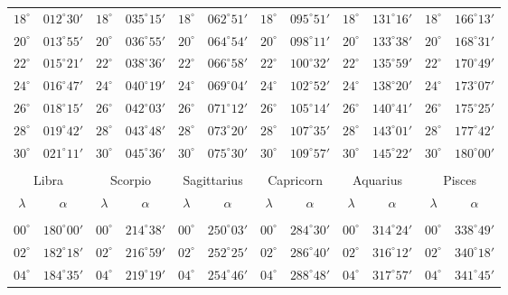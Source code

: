 \begin{table}[!h]
{\begin{tabular}{cc|cc|cc|cc|cc|cc}
$18^\circ$ & $012^\circ30'$ & $18^\circ$ & $035^\circ15'$ & $18^\circ$ & $062^\circ51'$ & $18^\circ$ & $095^\circ51'$ & $18^\circ$ & $131^\circ16'$ & $18^\circ$ & $166^\circ13'$\\
$20^\circ$ & $013^\circ55'$ & $20^\circ$ & $036^\circ55'$ & $20^\circ$ & $064^\circ54'$ & $20^\circ$ & $098^\circ11'$ & $20^\circ$ & $133^\circ38'$ & $20^\circ$ & $168^\circ31'$\\
$22^\circ$ & $015^\circ21'$ & $22^\circ$ & $038^\circ36'$ & $22^\circ$ & $066^\circ58'$ & $22^\circ$ & $100^\circ32'$ & $22^\circ$ & $135^\circ59'$ & $22^\circ$ & $170^\circ49'$\\
$24^\circ$ & $016^\circ47'$ & $24^\circ$ & $040^\circ19'$ & $24^\circ$ & $069^\circ04'$ & $24^\circ$ & $102^\circ52'$ & $24^\circ$ & $138^\circ20'$ & $24^\circ$ & $173^\circ07'$\\
$26^\circ$ & $018^\circ15'$ & $26^\circ$ & $042^\circ03'$ & $26^\circ$ & $071^\circ12'$ & $26^\circ$ & $105^\circ14'$ & $26^\circ$ & $140^\circ41'$ & $26^\circ$ & $175^\circ25'$\\
$28^\circ$ & $019^\circ42'$ & $28^\circ$ & $043^\circ48'$ & $28^\circ$ & $073^\circ20'$ & $28^\circ$ & $107^\circ35'$ & $28^\circ$ & $143^\circ01'$ & $28^\circ$ & $177^\circ42'$\\
$30^\circ$ & $021^\circ11'$ & $30^\circ$ & $045^\circ36'$ & $30^\circ$ & $075^\circ30'$ & $30^\circ$ & $109^\circ57'$ & $30^\circ$ & $145^\circ22'$ & $30^\circ$ & $180^\circ00'$\\
\multicolumn{12}{c}{}\\
\multicolumn{2}{c}{Libra}\vline & \multicolumn{2}{c}{Scorpio} \vline& \multicolumn{2}{c}{Sagittarius} \vline& \multicolumn{2}{c}{Capricorn}\vline &
\multicolumn{2}{c}{Aquarius}\vline & \multicolumn{2}{c}{Pisces}\\\hline
$\lambda$& $\alpha$& $\lambda$& $\alpha$& $\lambda$& $\alpha$& $\lambda$& $\alpha$& $\lambda$& $\alpha$& $\lambda$& $\alpha$\\\hline
&&&&&&&&&&&\\[-2ex]
$00^\circ$ & $180^\circ00'$ & $00^\circ$ & $214^\circ38'$ & $00^\circ$ & $250^\circ03'$ & $00^\circ$ & $284^\circ30'$ &  $00^\circ$ & $314^\circ24'$ & $00^\circ$ & $338^\circ49'$\\
$02^\circ$ & $182^\circ18'$ & $02^\circ$ & $216^\circ59'$ & $02^\circ$ & $252^\circ25'$ & $02^\circ$ & $286^\circ40'$ &  $02^\circ$ & $316^\circ12'$ & $02^\circ$ & $340^\circ18'$\\
$04^\circ$ & $184^\circ35'$ & $04^\circ$ & $219^\circ19'$ & $04^\circ$ & $254^\circ46'$ & $04^\circ$ & $288^\circ48'$ &  $04^\circ$ & $317^\circ57'$ & $04^\circ$ & $341^\circ45'$\\

\end{tabular}}
\end{table}
